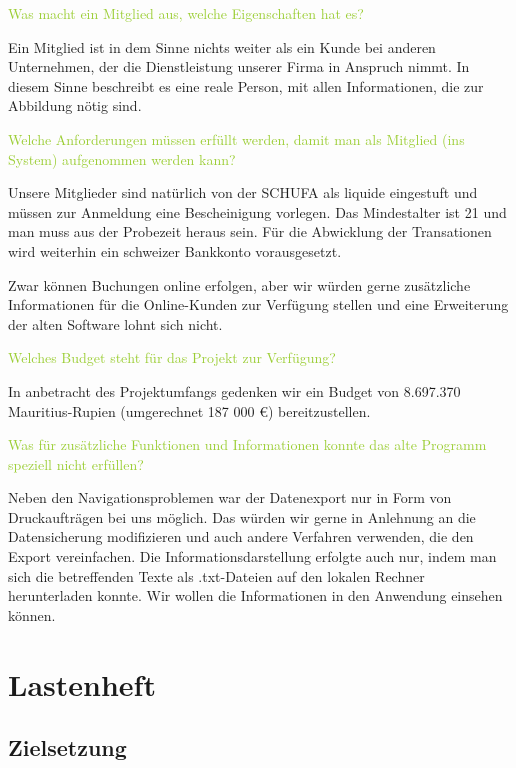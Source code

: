 \textcolor{YellowGreen}{Was macht ein Mitglied aus, welche Eigenschaften hat es?}

\textcolor{NavyBlue}{Ein Mitglied ist in dem Sinne nichts weiter als ein Kunde bei anderen Unternehmen, der die Dienstleistung unserer Firma in Anspruch nimmt. In diesem Sinne beschreibt es eine reale Person, mit allen Informationen, die zur Abbildung nötig sind. } %

\textcolor{YellowGreen}{Welche Anforderungen müssen erfüllt werden, damit man als Mitglied (ins System) aufgenommen werden kann?}

\textcolor{NavyBlue}{Unsere Mitglieder sind natürlich von der SCHUFA als liquide eingestuft und müssen zur Anmeldung eine Bescheinigung vorlegen. Das Mindestalter ist 21 und man muss aus der Probezeit heraus sein. Für die Abwicklung der Transationen wird weiterhin ein schweizer Bankkonto vorausgesetzt.}

Zwar können Buchungen online erfolgen, aber wir würden gerne zusätzliche Informationen für die Online-Kunden zur Verfügung stellen und eine Erweiterung der alten Software lohnt sich nicht.

\textcolor{YellowGreen}{Welches Budget steht für das Projekt zur Verfügung?}

\textcolor{NavyBlue}{In anbetracht des Projektumfangs gedenken wir ein Budget von 8.697.370 Mauritius-Rupien (umgerechnet 187 000 €) bereitzustellen.}

\textcolor{YellowGreen}{Was für zusätzliche Funktionen und Informationen konnte das alte Programm speziell nicht erfüllen?}

\textcolor{NavyBlue}{Neben den Navigationsproblemen war der Datenexport nur in Form von Druckaufträgen bei uns möglich. Das würden wir gerne in Anlehnung an die Datensicherung modifizieren und auch andere Verfahren verwenden, die den Export vereinfachen. Die Informationsdarstellung erfolgte auch nur, indem man sich die betreffenden Texte als .txt-Dateien auf den lokalen Rechner herunterladen konnte. Wir wollen die Informationen in den Anwendung einsehen können.}

\section{Lastenheft}

\subsection{Zielsetzung}

